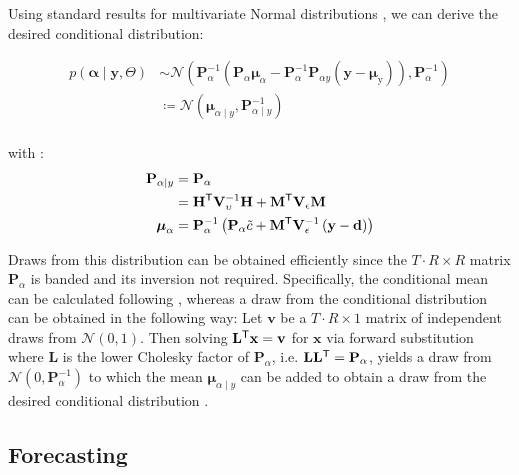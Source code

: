 \documentclass[notitlepage,a4paper,12pt]{article}
\newcommand{\transpose}[1]{{#1}^{\sf{T}}}
\begin{document}
Using standard results for multivariate Normal distributions \citep[e.g.][pp. 86-87]{bishop_prml_2006}, we can derive the desired conditional distribution:

\begin{align*}
    p
    \left(
        \boldsymbol{\alpha} \mid \mathbf{y}, \Theta
     \right) 
    &\sim
    \mathcal{N}
    \left(
    \mathbf{P}^{-1}_{\alpha} \left( \mathbf{P}_{\alpha}\boldsymbol{\mu}_{\alpha} - \mathbf{P}^{-1}_{\alpha} \mathbf{P}_{\alpha y} \left(\mathbf{y} - \boldsymbol{\mu}_{\text{y}}\right)\right), \mathbf{P}_{\alpha}^{-1}
    \right) \\
    &\coloneqq \mathcal{N}
        \left(
            \boldsymbol{\mu}_{\alpha\mid y}, \mathbf{P}_{\alpha\mid y}^{-1}
        \right) \\
\end{align*}

with \citep[see also][eqn. 6-8]{chanjeliazkov_2009}:
\begin{align*}
    \mathbf{P}_{\alpha\mid y} &= \mathbf{P}_{\alpha} \\
    &= 
    \transpose{\mathbf{H}} \mathbf{V}^{-1}_{\upsilon} \mathbf{H} + {\transpose{\mathbf{M}} \mathbf{V}_{\epsilon}\mathbf{M}}\\
    \boldsymbol\mu_{\alpha} &= \mathbf{P}_{\alpha}^{-1} \left(\mathbf{P}_{\alpha} \tilde{c}+ \transpose{\mathbf{M}} \mathbf{V}_{\epsilon}^{-1} \left(\mathbf{y} - \mathbf{d}\right) \right)
\end{align*}





Draws from this distribution can be obtained efficiently since the $T\cdot R \times R$ matrix $\mathbf{P}_{\alpha}$ is banded and its inversion not required. Specifically, the conditional mean can be calculated following \citet[][Algorithm 5]{rueheld_2005}, whereas a draw from the conditional distribution can be obtained in the following way: Let $\mathbf{v}$ be a $T\cdot R \times 1$ matrix of independent draws from $\mathcal{N}(0,1)$. Then solving $\transpose{\mathbf{L}}\mathbf{x} = \mathbf{v}$ for $\mathbf{x}$ via forward substitution where $\mathbf{L}$ is the lower Cholesky factor of $\mathbf{P}_{\alpha}$, i.e. $\mathbf{L}\transpose{\mathbf{L}} = \mathbf{P}_{\alpha}$, yields a draw from $\mathcal{N}(0, \mathbf{P}^{-1}_{\alpha})$ to which the mean $\mathbf{\mu}_{\alpha\mid y}$ can be added to obtain a draw from the desired conditional distribution \citep[][Algorithm 4]{rueheld_2005}.

\subsection{Forecasting}
\end{document}
